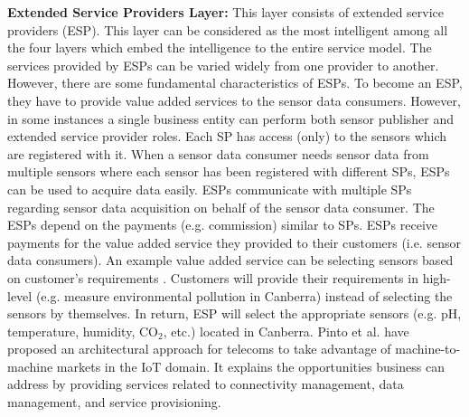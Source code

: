 \documentclass[times]{ettauth}
\begin{document}
\textbf{Extended Service Providers Layer:} This layer consists of extended service providers (ESP). This layer can be considered as the most intelligent among all the four layers which embed the intelligence to the entire service model. The services provided by ESPs can be varied widely from one provider to another. However, there are some fundamental characteristics of ESPs. To become an ESP, they have to provide value added services \cite{P668} to the sensor data consumers. However, in some instances a single business entity can perform both sensor publisher and extended service provider roles. Each SP has access (only) to the sensors which are registered with it. When a sensor data consumer needs sensor data from multiple sensors where each sensor has been registered with different SPs, ESPs can be used to acquire data easily. ESPs communicate with multiple SPs regarding sensor data acquisition on behalf of the sensor data consumer. The ESPs depend on the payments (e.g. commission) similar to SPs. ESPs receive payments for the value added service they provided to their customers (i.e. sensor data consumers). An example value added service can be selecting sensors based on customer's requirements \cite{ZMP004}. Customers will provide their requirements in high-level (e.g. measure environmental pollution in Canberra) instead of selecting the sensors by themselves. In return, ESP will select the appropriate sensors (e.g. pH, temperature, humidity, CO$_{2}$, etc.) located in Canberra. Pinto et al. \cite{P666} have proposed  an architectural approach for telecoms to take advantage of machine-to-machine markets in the IoT domain. It explains the opportunities  business can address by providing services related to connectivity management, data management, and service provisioning.
\end{document}
